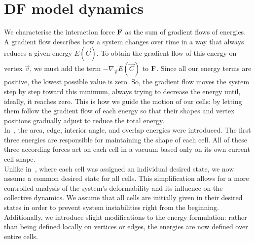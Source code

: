 \section{DF model dynamics} \label{dynamics}
We characterise the interaction force $\mathbf{F}$ as the sum of gradient flows of energies. \\
A gradient flow describes how a system changes over time in a way that always reduces a given energy $E(\vec{C})$.
To obtain the gradient flow of this energy on vertex $\vec{v}$, we must add the term $-\nabla_{\vec{v}} E(\vec{C})$ to $\mathbf{F}$.
Since all our energy terms are positive, the lowest possible value is zero.  
So, the gradient flow moves the system step by step toward this minimum, always trying to decrease the energy until, ideally, it reaches zero. 
This is how we guide the motion of our cells: by letting them follow the gradient flow of each energy so that their shapes and vertex positions gradually adjust to reduce the total energy. \\
In~\cite{Vogel2023}, the area, edge, interior angle, and overlap energies were introduced.
The first three energies are responsible for maintaining the shape of each cell. 
All of these three according forces act on each cell in a vacuum based only on its own current cell shape. \\
Unlike in~\cite{Vogel2023}, where each cell was assigned an individual desired state, we now assume a common desired state for all cells. This simplification allows for a more controlled analysis of the system's deformability and its influence on the collective dynamics.
We assume that all cells are initially given in their desired states in order to prevent system instabilities right from the beginning. \\
Additionally, we introduce slight modifications to the energy formulation: rather than being defined locally on vertices or edges, the energies are now defined over entire cells. 
